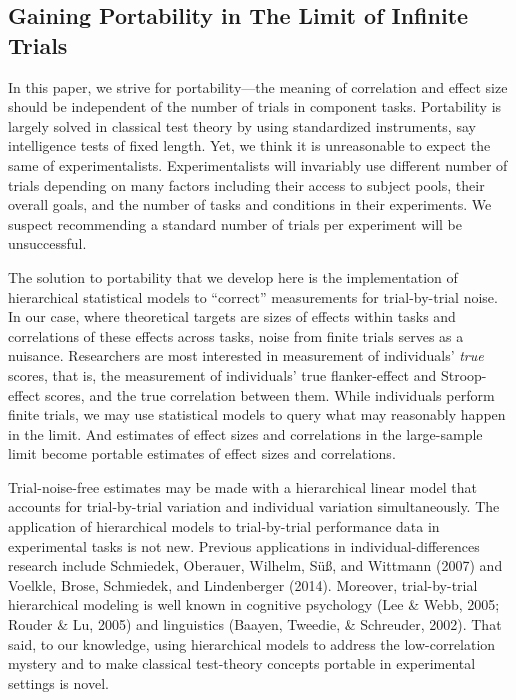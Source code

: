 \documentclass[english,man]{apa6}
\theoremstyle{definition}
\theoremstyle{definition}
\theoremstyle{definition}
\theoremstyle{remark}
\begin{document}
\subsection{Gaining Portability in The Limit of Infinite
Trials}\label{gaining-portability-in-the-limit-of-infinite-trials}

In this paper, we strive for portability---the meaning of correlation
and effect size should be independent of the number of trials in
component tasks. Portability is largely solved in classical test theory
by using standardized instruments, say intelligence tests of fixed
length. Yet, we think it is unreasonable to expect the same of
experimentalists. Experimentalists will invariably use different number
of trials depending on many factors including their access to subject
pools, their overall goals, and the number of tasks and conditions in
their experiments. We suspect recommending a standard number of trials
per experiment will be unsuccessful.

The solution to portability that we develop here is the implementation
of hierarchical statistical models to \enquote{correct} measurements for
trial-by-trial noise. In our case, where theoretical targets are sizes
of effects within tasks and correlations of these effects across tasks,
noise from finite trials serves as a nuisance. Researchers are most
interested in measurement of individuals' \emph{true} scores, that is,
the measurement of individuals' true flanker-effect and Stroop-effect
scores, and the true correlation between them. While individuals perform
finite trials, we may use statistical models to query what may
reasonably happen in the limit. And estimates of effect sizes and
correlations in the large-sample limit become portable estimates of
effect sizes and correlations.

Trial-noise-free estimates may be made with a hierarchical linear model
that accounts for trial-by-trial variation and individual variation
simultaneously. The application of hierarchical models to trial-by-trial
performance data in experimental tasks is not new. Previous applications
in individual-differences research include Schmiedek, Oberauer, Wilhelm,
Süß, and Wittmann (2007) and Voelkle, Brose, Schmiedek, and Lindenberger
(2014). Moreover, trial-by-trial hierarchical modeling is well known in
cognitive psychology (Lee \& Webb, 2005; Rouder \& Lu, 2005) and
linguistics (Baayen, Tweedie, \& Schreuder, 2002). That said, to our
knowledge, using hierarchical models to address the low-correlation
mystery and to make classical test-theory concepts portable in
experimental settings is novel.
\end{document}
